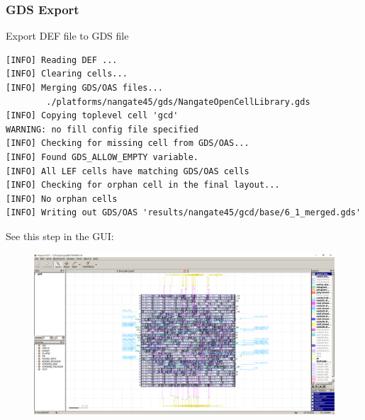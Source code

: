 \documentclass[a4paper,12pt,twoside]{article}
\begin{document}
\subsubsection{GDS Export}
Export DEF file to GDS file
\begin{verbatim}
[INFO] Reading DEF ...
[INFO] Clearing cells...
[INFO] Merging GDS/OAS files...
        ./platforms/nangate45/gds/NangateOpenCellLibrary.gds
[INFO] Copying toplevel cell 'gcd'
WARNING: no fill config file specified
[INFO] Checking for missing cell from GDS/OAS...
[INFO] Found GDS_ALLOW_EMPTY variable.
[INFO] All LEF cells have matching GDS/OAS cells
[INFO] Checking for orphan cell in the final layout...
[INFO] No orphan cells
[INFO] Writing out GDS/OAS 'results/nangate45/gcd/base/6_1_merged.gds'
\end{verbatim}
See this step in the GUI:
\begin{figure}[H]
    \centering
    \includegraphics[width=\textwidth]{images/5.png}
\end{figure}
\end{document}
